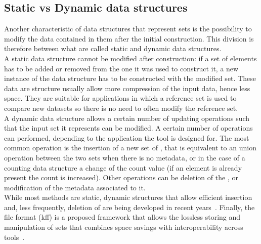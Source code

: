 \subsection{Static vs Dynamic data structures}
\label{sec:staticdynamic}
Another characteristic of data structures that represent \kmer sets is the possibility to modify the data contained in them after the initial construction. This division is therefore between what are called static and dynamic data structures. \\
A static data structure cannot be modified after construction: if a set of elements has to be added or removed from the one it was used to construct it, a new instance of the data structure has to be constructed with the modified set. These data are structure usually allow more compression of the input data, hence less space. They are suitable for applications in which a reference set is used to compare new datasets so there is no need to often modify the reference set.\\
A dynamic data structure allows a certain number of updating operations such that the input set it represents can be modified. A certain number of operations can performed, depending to the application the tool is designed for. The most common operation is the insertion of a new set of \kmers, that is equivalent to an union operation between the two sets when there is no metadata, or in the case of a counting data structure a change of the count value (if an element is already present the count is increased). Other operations can be deletion of the \kmer, or modification of the metadata associated to it. \\
While most methods are static, dynamic structures that allow efficient insertion and, less frequently, deletion of \kmers are being developed in recent years~\cite{marchet2024kmersets}.
Finally, the \kmer file format (kff) is a proposed framework that allows the lossless storing and manipulation of \kmer sets that combines space savings with interoperability across tools~\cite{kmer-file-format}.

